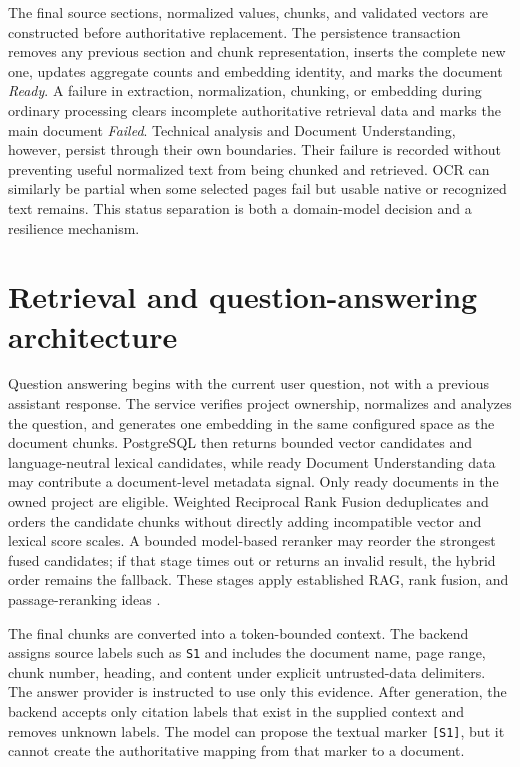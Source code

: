 The final source sections, normalized values, chunks, and validated vectors are
constructed before authoritative replacement. The persistence transaction
removes any previous section and chunk representation, inserts the complete new
one, updates aggregate counts and embedding identity, and marks the document
\emph{Ready}. A failure in extraction, normalization, chunking, or embedding
during ordinary processing clears incomplete authoritative retrieval data and
marks the main document \emph{Failed}. Technical analysis and Document
Understanding, however, persist through their own boundaries. Their failure is
recorded without preventing useful normalized text from being chunked and
retrieved. OCR can similarly be partial when some selected pages fail but
usable native or recognized text remains. This status separation is both a
domain-model decision and a resilience mechanism.

\section{Retrieval and question-answering architecture}
\label{sec:retrieval-answering-architecture}

Question answering begins with the current user question, not with a previous
assistant response. The service verifies project ownership, normalizes and
analyzes the question, and generates one embedding in the same configured space
as the document chunks. PostgreSQL then returns bounded vector candidates and
language-neutral lexical candidates, while ready Document Understanding data
may contribute a document-level metadata signal. Only ready documents in the
owned project are eligible. Weighted Reciprocal Rank Fusion deduplicates and
orders the candidate chunks without directly adding incompatible vector and
lexical score scales. A bounded model-based reranker may reorder the strongest
fused candidates; if that stage times out or returns an invalid result, the
hybrid order remains the fallback. These stages apply established RAG, rank
fusion, and passage-reranking ideas \cite{Lewis2020RAG,Cormack2009RRF,Nogueira2019BERT}.

The final chunks are converted into a token-bounded context. The backend assigns
source labels such as \texttt{S1} and includes the document name, page range,
chunk number, heading, and content under explicit untrusted-data delimiters.
The answer provider is instructed to use only this evidence. After generation,
the backend accepts only citation labels that exist in the supplied context and
removes unknown labels. The model can propose the textual marker
\texttt{[S1]}, but it cannot create the authoritative mapping from that marker
to a document.

